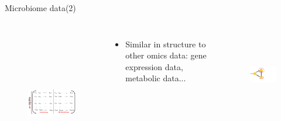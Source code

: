 \documentclass[a4paper,9pt]{beamer}
\begin{document}
\begin{frame}{\huge{Microbiome data(2)}}
\begin{columns}
\begin{figure}[H]
\centering
\includegraphics[scale =0.4,height=6.6cm,width=7cm]{ootu.pdf}
\end{figure}

\begin{itemize}
\small
\item \small{Similar in structure to other omics data: gene expression data, metabolic data...}
\end{itemize}
\begin{figure}[H]
\centering
\includegraphics[scale =0.2,height=4cm,width=3.9cm]{mm.pdf}
\end{figure}
\end{columns}
\end{frame}
\end{document}
